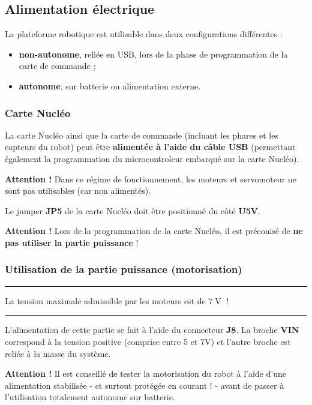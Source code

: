 \documentclass[a4paper,11pt,titlepage]{article} %
\begin{document}
\subsection{Alimentation électrique}

La plateforme robotique est utilisable dans deux configurations différentes :
\begin{itemize}
	\item \textbf{non-autonome}, reliée en USB, lors de la phase de programmation de la carte de commande ;
	\item \textbf{autonome}, sur batterie ou alimentation externe.
\end{itemize}

\subsubsection{Carte Nucléo}

La carte Nucléo ainsi que la carte de commande (incluant les phares et les capteurs du robot) peut être \textbf{alimentée à l'aide du câble USB} (permettant également la programmation du microcontroleur embarqué sur la carte Nucléo).

\textbf{Attention !} Dans ce régime de fonctionnement, les moteurs et servomoteur ne sont pas utilisables (car non alimentés).

Le jumper \textbf{JP5} de la carte Nucléo doit être positionné du côté \textbf{U5V}.

\textbf{Attention !} Lors de la programmation de la carte Nucléo, il est préconisé de \textbf{ne pas utiliser la partie puissance} !

\subsubsection{Utilisation de la partie puissance (motorisation)}

\noindent \rule{\linewidth}{1pt}

\medskip

{\large La tension maximale admissible par les moteurs est de $7\operatorname{V}$ !}

\medskip

\noindent \rule{\linewidth}{1pt}

L'alimentation de cette partie se fait à l'aide du connecteur \textbf{J8}. La broche \textbf{VIN} correspond à la tension positive (comprise entre 5 et 7V) et l'autre broche est reliée à la masse du système.

\textbf{Attention !} Il est conseillé de tester la motorisation du robot à l'aide d'une alimentation stabilisée - et surtout protégée en courant ! - avant de passer à l'utilisation totalement autonome sur batterie.
\end{document}
